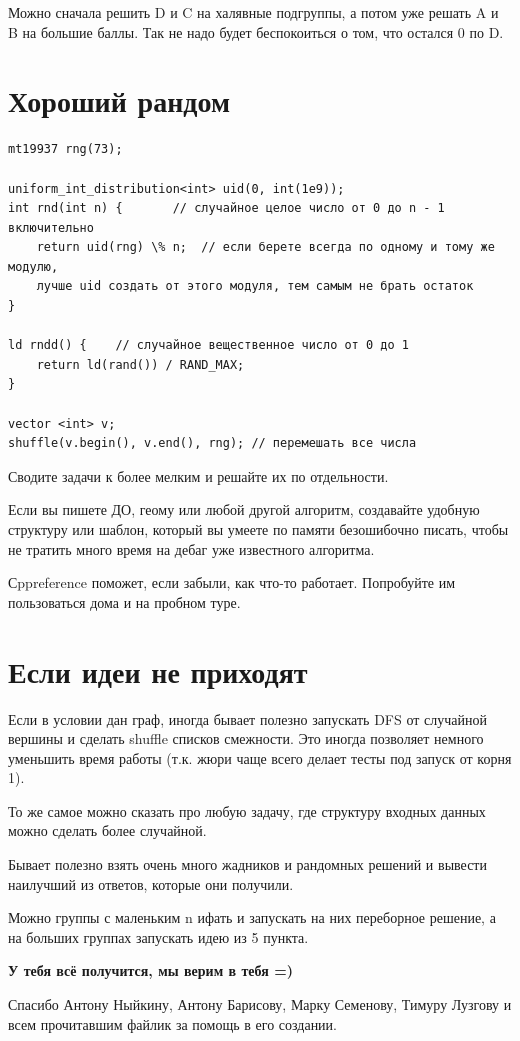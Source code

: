 \documentclass[12pt,a4paper]{article}
\begin{document}
Можно сначала решить D и C на халявные подгруппы, а потом уже решать A и B на большие баллы. Так не надо будет беспокоиться о том, что остался 0 по D.

\section*{Хороший рандом}

\begin{verbatim}
mt19937 rng(73);

uniform_int_distribution<int> uid(0, int(1e9));
int rnd(int n) {	   // случайное целое число от 0 до n - 1 включительно
    return uid(rng) \% n;  // если берете всегда по одному и тому же модулю,
    лучше uid создать от этого модуля, тем самым не брать остаток
}
 
ld rndd() {    // случайное вещественное число от 0 до 1
    return ld(rand()) / RAND_MAX;
}

vector <int> v;
shuffle(v.begin(), v.end(), rng); // перемешать все числа
\end{verbatim}

Сводите задачи к более мелким и решайте их по отдельности.

Если вы пишете ДО, геому или любой другой алгоритм, создавайте удобную структуру или шаблон, который вы умеете по памяти безошибочно писать, чтобы не тратить много время на дебаг уже известного алгоритма.

Сppreference поможет, если забыли, как что-то работает. Попробуйте им пользоваться дома и на пробном туре.

\section*{Если идеи не приходят}

Если в условии дан граф, иногда бывает полезно запускать DFS от случайной вершины и сделать shuffle списков смежности. Это иногда позволяет немного уменьшить время работы (т.к. жюри чаще всего делает тесты под запуск от корня 1).

То же самое можно сказать про любую задачу, где структуру входных данных можно сделать более случайной.

Бывает полезно взять очень много жадников и рандомных решений и вывести наилучший из ответов, которые они получили.

Можно группы с маленьким n ифать и запускать на них переборное решение, а на больших группах запускать идею из 5 пункта.

\bigskip
\textbf{У тебя всё получится, мы верим в тебя =)}

\bigskip

Спасибо Антону Ныйкину, Антону Барисову, Марку Семенову, Тимуру Лузгову и всем прочитавшим файлик за помощь в его создании.
\end{document}
